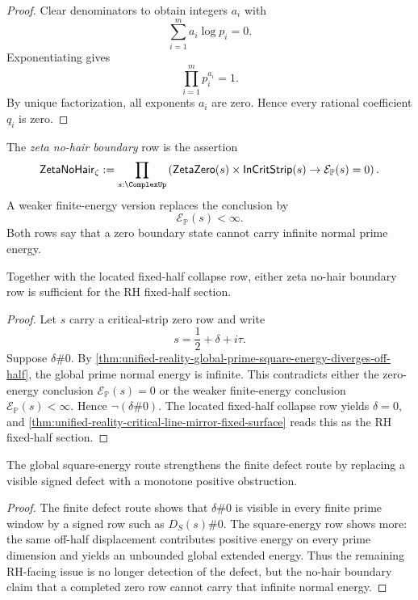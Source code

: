 \begin{proof}
Clear denominators to obtain integers $a_i$ with
$$
\sum_{i=1}^{m}a_i\log p_i=0.
$$
Exponentiating gives
$$
\prod_{i=1}^{m}p_i^{a_i}=1.
$$
By unique factorization, all exponents $a_i$ are zero.  Hence every
rational coefficient $q_i$ is zero.
\end{proof}

\begin{definition}
\label{def:unified-reality-zeta-no-hair-boundary}
The \emph{zeta no-hair boundary} row is the assertion
$$
\mathsf{ZetaNoHair}_{\zeta}
:=
\prod_{s:\ComplexUp}
\left(
\mathsf{ZetaZero}(s)
\times
\mathsf{InCritStrip}(s)
\to
\mathcal E_{\mathbb P}(s)=0
\right).
$$
A weaker finite-energy version replaces the conclusion by
$$
\mathcal E_{\mathbb P}(s)<\infty.
$$
Both rows say that a zero boundary state cannot carry infinite normal
prime energy.
\end{definition}

\begin{theorem}
\label{thm:unified-reality-no-hair-boundary-conditionally-sufficient}
Together with the located fixed-half collapse row, either zeta no-hair
boundary row is sufficient for the RH fixed-half section.
\end{theorem}

\begin{proof}
Let $s$ carry a critical-strip zero row and write
$$
s=\frac12+\delta+i\tau.
$$
Suppose $\delta\#0$.  By
\autoref{thm:unified-reality-global-prime-square-energy-diverges-off-half},
the global prime normal energy is infinite.  This contradicts either the
zero-energy conclusion $\mathcal E_{\mathbb P}(s)=0$ or the weaker
finite-energy conclusion $\mathcal E_{\mathbb P}(s)<\infty$.  Hence
$\neg(\delta\#0)$.  The located fixed-half collapse row yields
$\delta=0$, and
\autoref{thm:unified-reality-critical-line-mirror-fixed-surface} reads
this as the RH fixed-half section.
\end{proof}

\begin{corollary}
\label{cor:unified-reality-positive-energy-strengthens-defect-visibility}
The global square-energy route strengthens the finite defect route by
replacing a visible signed defect with a monotone positive obstruction.
\end{corollary}

\begin{proof}
The finite defect route shows that $\delta\#0$ is visible in every finite
prime window by a signed row such as $D_S(s)\#0$.  The square-energy row
shows more: the same off-half displacement contributes positive energy
on every prime dimension and yields an unbounded global extended energy.
Thus the remaining RH-facing issue is no longer detection of the defect,
but the no-hair boundary claim that a completed zero row cannot carry
that infinite normal energy.
\end{proof}
